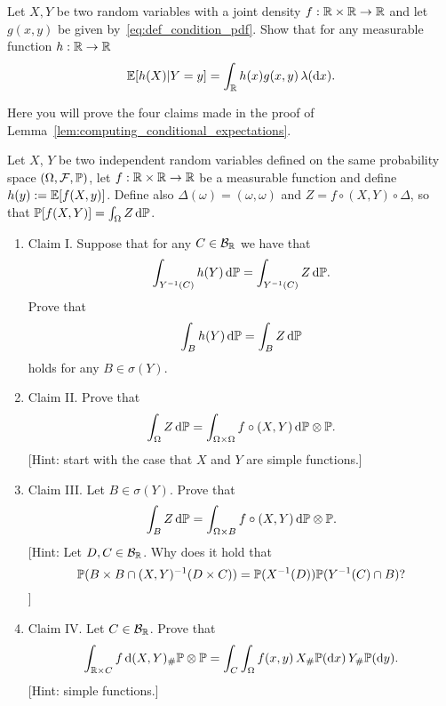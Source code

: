 \begin{problem}
Let $X,Y$ be two random variables with a joint density $f : \mathbb R \times \mathbb R \to \mathbb R$ and let $g(x,y)$ be given by~\eqref{eq:def_condition_pdf}. Show that for any measurable function $h : \mathbb R \to \mathbb R$
\[
	\mathbb E[h(X) | Y = y] = \int_{\mathbb R} h(x) g(x,y) \, \lambda(\mathrm{d} x).
\]
\end{problem}

\begin{problem}\label{prb:computing_conditional_expectations}
Here you will prove the four claims made in the proof of Lemma~\ref{lem:computing_conditional_expectations}.

Let $X$, $Y$ be two independent random variables defined on the same probability space $(\Omega, \mathcal F, \mathbb P)$, let $f : \mathbb R \times \mathbb R \to \mathbb R$ be a measurable function and define $h(y) := \mathbb E[f(X,y)]$. Define also $\Delta(\omega) = (\omega, \omega)$ and $Z = f \circ (X, Y) \circ \Delta$, so that $\mathbb P[f(X,Y)] = \int_\Omega Z \, \mathrm{d} \mathbb P$.

\begin{enumerate}[label={(\alph*)}]
\item Claim I. Suppose that for any $C \in \mathcal B_{\mathbb R}$ we have that
\[
	\int_{Y^{-1}(C)} h(Y) \, \mathrm{d} \mathbb P = \int_{Y^{-1}(C)} Z \, \mathrm{d} \mathbb P.
\]
Prove that
\[
	\int_B h(Y) \, \mathrm{d} \mathbb P = \int_B Z \, \mathrm{d} \mathbb P
\]
holds for any $B \in \sigma(Y)$.
\item Claim II. Prove that
\[
	\int_\Omega Z \, \mathrm{d} \mathbb P = \int_{\Omega \times \Omega} f \circ (X,Y) \, \mathrm{d} \mathbb P \otimes \mathbb P.
\]
[Hint: start with the case that $X$ and $Y$ are simple functions.]
\item Claim III. Let $B \in \sigma(Y)$. Prove that
\[
	\int_{B} Z \, \mathrm{d} \mathbb P = \int_{\Omega \times B} f \circ (X,Y) \, \mathrm{d} \mathbb P \otimes \mathbb P.
\]
[Hint: Let $D, C \in \mathcal B_{\mathbb R}$. Why does it hold that 
\[
	\mathbb P(B \times B \cap (X,Y)^{-1}(D \times C)) = \mathbb P(X^{-1}(D))\mathbb P(Y^{-1}(C) \cap B)?
\]
]
\item Claim IV. Let $C \in \mathcal B_{\mathbb R}$. Prove that
\[
	\int_{\mathbb R \times C} f \, \mathrm{d} (X,Y)_\# \mathbb P \otimes \mathbb P
	= \int_C \int_\Omega f(x,y) \, X_\#\mathbb P(\mathrm{d} x) \, Y_\# \mathbb P (\mathrm{d} y).
\]
[Hint: simple functions.]
\end{enumerate}
\end{problem}


